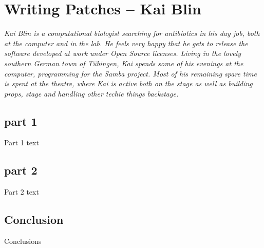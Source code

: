 \chapter{Writing Patches -- Kai Blin}

\textit{Kai Blin is a computational biologist searching for antibiotics in his
    day job, both at the computer and in the lab. He feels very happy that he
    gets to release the software developed at work under Open Source licenses.
    Living in the lovely southern German town of T\"ubingen, Kai spends some of
    his evenings at the computer, programming for the Samba project. Most of
    his remaining spare time is spent at the theatre, where Kai is active both
    on the stage as well as building props, stage and handling other techie
    things backstage.}



\section*{part 1}

Part 1 text


\section*{part 2}

Part 2 text


\section*{Conclusion}

Conclusions
